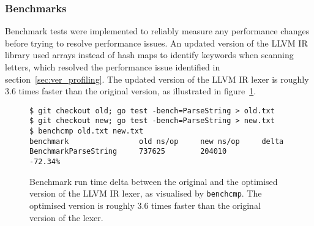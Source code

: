 
\subsubsection{Benchmarks}
\label{sec:ver_benchmarks}

Benchmark tests were implemented to reliably measure any performance changes before trying to resolve performance issues. An updated version of the LLVM IR library used arrays instead of hash maps to identify keywords when scanning letters, which resolved the performance issue identified in section~\ref{sec:ver_profiling}. The updated version of the LLVM IR lexer is roughly 3.6 times faster than the original version, as illustrated in figure~\ref{fig:benchmark_delta}.

\begin{figure}[htbp]
	\begin{center}
		\begin{verbatim}
$ git checkout old; go test -bench=ParseString > old.txt
$ git checkout new; go test -bench=ParseString > new.txt
$ benchcmp old.txt new.txt
benchmark                old ns/op     new ns/op     delta
BenchmarkParseString     737625        204010        -72.34%
		\end{verbatim}
		\caption{Benchmark run time delta between the original and the optimised version of the LLVM IR lexer, as visualised by \texttt{benchcmp}\protect\footnotemark. The optimised version is roughly 3.6 times faster than the original version of the lexer.}
		\label{fig:benchmark_delta}
	\end{center}
\end{figure}
